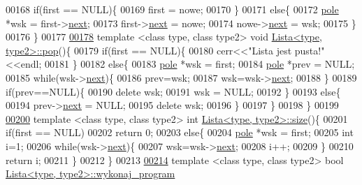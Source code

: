 \begin{DoxyCode}
00168   \textcolor{keywordflow}{if}(first == NULL)\{
00169     first = nowe;
00170   \}
00171   \textcolor{keywordflow}{else}\{
00172     \hyperlink{struct_lista_1_1pole}{pole} *wsk = first->\hyperlink{struct_lista_1_1pole_affb99c0a72df68fbc83eab9027f7d26e}{next};
00173     first->\hyperlink{struct_lista_1_1pole_affb99c0a72df68fbc83eab9027f7d26e}{next} = nowe;
00174     nowe->\hyperlink{struct_lista_1_1pole_affb99c0a72df68fbc83eab9027f7d26e}{next} = wsk;
00175   \}
00176 \}
00177 
\hypertarget{lista_8hh_source_l00178}{}\hyperlink{class_lista_ac3c0760924a0cae03f837a581640d32b}{00178} \textcolor{keyword}{template} <\textcolor{keyword}{class} type, \textcolor{keyword}{class} type2> \textcolor{keywordtype}{void} \hyperlink{class_lista_ac3c0760924a0cae03f837a581640d32b}{Lista<type, type2>::pop}()\{
00179   \textcolor{keywordflow}{if}(first == NULL)\{
00180     cerr<<\textcolor{stringliteral}{"Lista jest pusta!"}<<endl;
00181   \}
00182   \textcolor{keywordflow}{else}\{
00183     \hyperlink{struct_lista_1_1pole}{pole} *wsk = first;
00184     \hyperlink{struct_lista_1_1pole}{pole} *prev = NULL;
00185     \textcolor{keywordflow}{while}(wsk->\hyperlink{struct_lista_1_1pole_affb99c0a72df68fbc83eab9027f7d26e}{next})\{
00186       prev=wsk;
00187       wsk=wsk->\hyperlink{struct_lista_1_1pole_affb99c0a72df68fbc83eab9027f7d26e}{next};
00188     \}
00189     \textcolor{keywordflow}{if}(prev==NULL)\{
00190       \textcolor{keyword}{delete} wsk;
00191       wsk = NULL;
00192     \}
00193     \textcolor{keywordflow}{else}\{
00194       prev->\hyperlink{struct_lista_1_1pole_affb99c0a72df68fbc83eab9027f7d26e}{next} = NULL;
00195       \textcolor{keyword}{delete} wsk;
00196     \}
00197   \}
00198 \}
00199 
\hypertarget{lista_8hh_source_l00200}{}\hyperlink{class_lista_a2951b209d8977cc61a570ce46fff1e82}{00200} \textcolor{keyword}{template} <\textcolor{keyword}{class} type, \textcolor{keyword}{class} type2> \textcolor{keywordtype}{int} \hyperlink{class_lista_a2951b209d8977cc61a570ce46fff1e82}{Lista<type, type2>::size}()\{
00201   \textcolor{keywordflow}{if}(first == NULL)
00202     \textcolor{keywordflow}{return} 0;
00203   \textcolor{keywordflow}{else}\{
00204     \hyperlink{struct_lista_1_1pole}{pole} *wsk = first;
00205     \textcolor{keywordtype}{int} i=1;
00206     \textcolor{keywordflow}{while}(wsk->\hyperlink{struct_lista_1_1pole_affb99c0a72df68fbc83eab9027f7d26e}{next})\{
00207       wsk=wsk->\hyperlink{struct_lista_1_1pole_affb99c0a72df68fbc83eab9027f7d26e}{next};
00208       i++;
00209     \}
00210     \textcolor{keywordflow}{return} i;
00211   \}
00212 \}
00213 
\hypertarget{lista_8hh_source_l00214}{}\hyperlink{class_lista_af74ba5fb933184e05ec9daf952f4cf86}{00214} \textcolor{keyword}{template} <\textcolor{keyword}{class} type, \textcolor{keyword}{class} type2> \textcolor{keywordtype}{bool} \hyperlink{class_program_ac396401ba5cade863d0e6acb727bec4e}{Lista<type, type2>::wykonaj\_program}

\end{DoxyCode}
